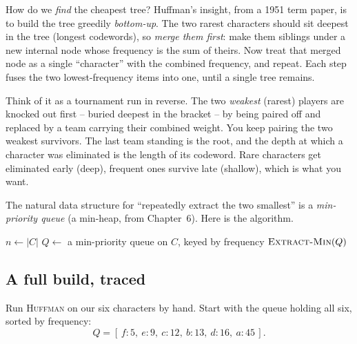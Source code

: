 How do we \emph{find} the cheapest tree? Huffman's insight, from a 1951 term
paper, is to build the tree greedily \emph{bottom-up}. The two rarest
characters should sit deepest in the tree (longest codewords), so \emph{merge
them first}: make them siblings under a new internal node whose frequency is the
sum of theirs. Now treat that merged node as a single ``character'' with the
combined frequency, and repeat. Each step fuses the two lowest-frequency items
into one, until a single tree remains.

\begin{intuitionbox}
Think of it as a tournament run in reverse. The two \emph{weakest} (rarest)
players are knocked out first -- buried deepest in the bracket -- by being paired
off and replaced by a team carrying their combined weight. You keep pairing the
two weakest survivors. The last team standing is the root, and the depth at which
a character was eliminated is the length of its codeword. Rare characters get
eliminated early (deep), frequent ones survive late (shallow), which is what
you want.
\end{intuitionbox}

The natural data structure for ``repeatedly extract the two smallest'' is a
\emph{min-priority queue} (a min-heap, from Chapter~6). Here is the algorithm.

\begin{algorithm}[H]
\caption{\textsc{Huffman}($C$)}
$n \leftarrow |C|$\;
$Q \leftarrow$ a min-priority queue on $C$, keyed by frequency\;
\Return $\textsc{Extract-Min}(Q)$ 
\end{algorithm}

\subsection{A full build, traced}

Run \textsc{Huffman} on our six characters by hand. Start with the queue
holding all six, sorted by frequency:
\[
  Q = [\,f{:}5,\ e{:}9,\ c{:}12,\ b{:}13,\ d{:}16,\ a{:}45\,].
\]

